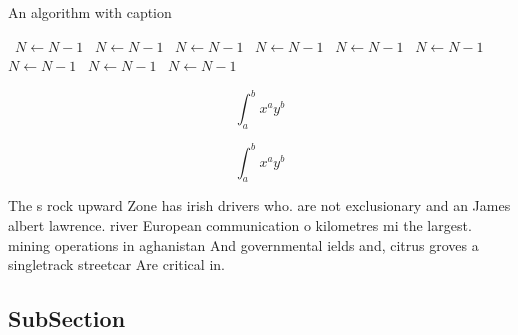 \documentclass[a4paper]{article}
\begin{document}
\begin{algorithm}
\caption{An algorithm with caption}
\begin{algorithmic}
\    \State $N \gets N - 1$
\    \State $N \gets N - 1$
\    \State $N \gets N - 1$
\    \State $N \gets N - 1$
\    \State $N \gets N - 1$
\    \State $N \gets N - 1$
\    \State $N \gets N - 1$
\    \State $N \gets N - 1$
\    \State $N \gets N - 1$
\EndWhile
\end{algorithmic}
\end{algorithm}

\[ \int_{a}^{b}{x^{a}y^{b}} \]

\[ \int_{a}^{b}{x^{a}y^{b}} \]

The s rock upward Zone has irish drivers who. are not exclusionary and an James albert lawrence. river European communication o kilometres mi the largest. mining operations in aghanistan And governmental ields and, citrus groves a singletrack streetcar Are critical in.

\subsection{SubSection}
\end{document}
